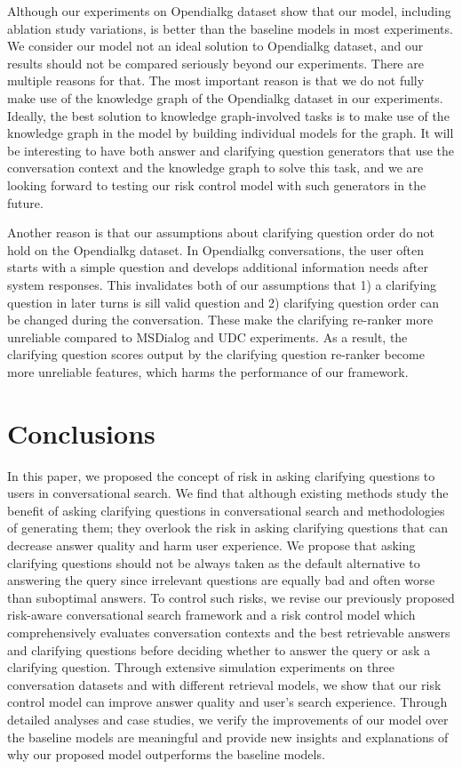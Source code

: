 \documentclass[format=acmsmall, review=False, screen=true]{acmart}
\begin{document}
Although our experiments on Opendialkg dataset show that our model, including ablation study variations, is better than the baseline models in most experiments. We consider our model not an ideal solution to Opendialkg dataset, and our results should not be compared seriously beyond our experiments. There are multiple reasons for that. The most important reason is that we do not fully make use of the knowledge graph of the Opendialkg dataset in our experiments. Ideally, the best solution to knowledge graph-involved tasks is to make use of the knowledge graph in the model by building individual models for the graph. It will be interesting to have both answer and clarifying question generators that use the conversation context and the knowledge graph to solve this task, and we are looking forward to testing our risk control model with such generators in the future.

Another reason is that our assumptions about clarifying question order do not hold on the Opendialkg dataset. In Opendialkg conversations, the user often starts with a simple question and develops additional information needs after system responses. This invalidates both of our assumptions that 1) a clarifying question in later turns is sill valid question and 2) clarifying question order can be changed during the conversation. These make the clarifying re-ranker more unreliable compared to MSDialog and UDC experiments. As a result, the clarifying question scores output by the clarifying question re-ranker become more unreliable features, which harms the performance of our framework.



\section{Conclusions}

In this paper, we proposed the concept of risk in asking clarifying questions to users in conversational search. We find that although existing methods study the benefit of asking clarifying questions in conversational search and methodologies of generating them; they overlook the risk in asking clarifying questions that can decrease answer quality and harm user experience. We propose that asking clarifying questions should not be always taken as the default alternative to answering the query since irrelevant questions are equally bad and often worse than suboptimal answers. To control such risks, we revise our previously proposed risk-aware conversational search framework and a risk control model which comprehensively evaluates conversation contexts and the best retrievable answers and clarifying questions before deciding whether to answer the query or ask a clarifying question. Through extensive simulation experiments on three conversation datasets and with different retrieval models, we show that our risk control model can improve answer quality and user's search experience. Through detailed analyses and case studies, we verify the improvements of our model over the baseline models are meaningful and provide new insights and explanations of why our proposed model outperforms the baseline models.
\end{document}
